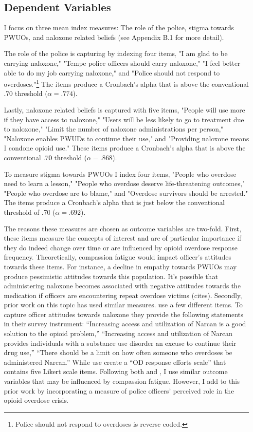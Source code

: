 \subsection{Dependent Variables}

I focus on three mean index measures: The role of the police, stigma towards PWUOs, and naloxone related beliefs (see Appendix B.1 for more detail). 

The role of the police is capturing by indexing four items, "I am glad to be carrying naloxone," "Tempe police officers should carry naloxone," "I feel better able to do my job carrying naloxone," and "Police should not respond to overdoses."\footnote{Police should not respond to overdoses is reverse coded.} The items produce a Cronbach's alpha that is above the conventional .70 threshold (\(\alpha = .774\)).

Lastly, naloxone related beliefs is captured with five items, "People will use more if they have access to naloxone," "Users will be less likely to go to treatment due to naloxone," "Limit the number of naloxone administrations per person," "Naloxone enables PWUDs to continue their use," and "Providing naloxone means I condone opioid use." These items produce a Cronbach's alpha that is above the conventional .70 threshold (\(\alpha = .868\)).

To measure stigma towards PWUOs I index four items, "People who overdose need to learn a lesson," "People who overdose deserve life-threatening outcomes," "People who overdose are to blame," and "Overdose survivors should be arrested." The items produce a Cronbach's alpha that is just below the conventional threshold of .70 (\(\alpha = .692\)).

The reasons these measures are chosen as outcome variables are two-fold. First, these items measure the concepts of interest and are of particular importance if they do indeed change over time or are influenced by opioid overdose response frequency. Theoretically, compassion fatigue would impact officer's attitudes towards these items. For instance, a decline in empathy towards PWUOs may produce pessimistic attitudes towards this population. It's possible that administering naloxone becomes associated with negative attitudes towards the medication if officers are encountering repeat overdose victims (cites). Secondly, prior work on this topic has used similar measures. \textcite{murphy_police_2020} use a few different items. To capture officer attitudes towards naloxone they provide the following statements in their survey instrument: “Increasing access and utilization of Narcan is a good solution to the opioid problem,” “Increasing access and utilization of Narcan provides individuals with a substance use disorder an excuse to continue their drug use,” “There should be a limit on how often someone who overdoses be administered Narcan.” While \textcite{carroll_knowledge_2020} use create a “OD response efforts scale” that contains five Likert scale items. Following both \textcite{murphy_police_2020} and \textcite{carroll_knowledge_2020}, I use similar outcome variables that may be influenced by compassion fatigue. However, I add to this prior work by incorporating a measure of police officers' perceived role in the opioid overdose crisis.

